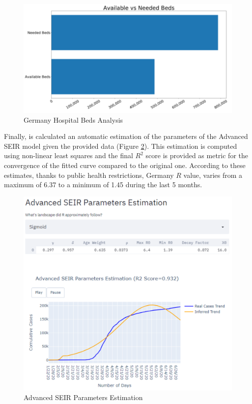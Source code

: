 \vspace{-0.3cm}
\begin{figure}[ht!]%
    \centering
    \includegraphics[width=0.65\linewidth]{latex/images/cov_g3.pdf}
    \vspace{-0.3cm}
    \caption{Germany Hospital Beds Analysis}
    \label{germ_bed}
    \vspace{-0.3cm}
\end{figure}

\vspace{-0.3cm}
Finally, is calculated an automatic estimation of the parameters of the Advanced SEIR model given the provided data (Figure \ref{par_est}). This estimation is computed using non-linear least squares and the final $R^{2}$ score is provided as metric for the convergence of the fitted curve compared to the original one. According to these estimates, thanks to public health restrictions, Germany $R$ value, varies from a maximum of 6.37 to a minimum of 1.45 during the last 5 months.

\begin{figure}[ht!]%
    \centering
    \includegraphics[width=0.75\linewidth]{latex/images/germ_params.pdf}
    \caption{Advanced SEIR Parameters Estimation}
    \label{par_est}
\end{figure}

